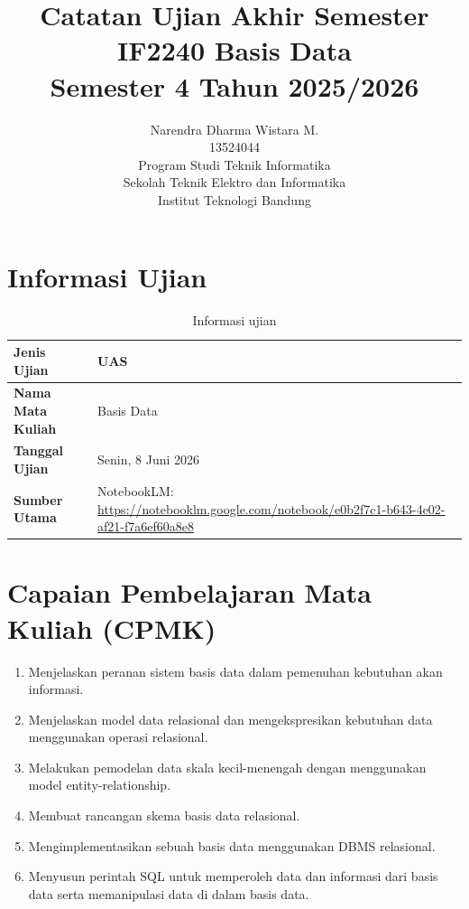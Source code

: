 \documentclass[11pt,a4paper]{article}
\title{%
    \vspace{-2cm}
    \textbf{\LARGE Catatan Ujian Akhir Semester} \\[0.25em]
    \Large IF2240 Basis Data \\[0.25em]
    \normalsize Semester 4 Tahun 2025/2026 \\[2em]
}
\author{%
    Narendra Dharma Wistara M. \\[0.25em]
    13524044 \\[2.5em]
    Program Studi Teknik Informatika \\[0.25em]
    Sekolah Teknik Elektro dan Informatika \\[0.25em]
    Institut Teknologi Bandung \\[0.25em]
}
\begin{document}
\begin{titlepage}
    \maketitle
    \thispagestyle{empty}
\end{titlepage}

\clearpage

\tableofcontents

\clearpage
{}

\section{Informasi Ujian}

\begin{table}[H]
\centering
\begin{tabularx}{\textwidth}{|L{0.30\textwidth}|X|}
\hline
\textbf{Jenis Ujian} & UAS \\
\hline
\textbf{Nama Mata Kuliah} & Basis Data \\
\hline
\textbf{Tanggal Ujian} & Senin, 8 Juni 2026 \\
\hline
\textbf{Sumber Utama} & NotebookLM: \url{https://notebooklm.google.com/notebook/e0b2f7c1-b643-4e02-af21-f7a6ef60a8e8} \\
\hline
\end{tabularx}
\caption{Informasi ujian}
\label{tab:informasi-ujian}
\end{table}

\section{Capaian Pembelajaran Mata Kuliah (CPMK)}

\begin{enumerate}
    \item Menjelaskan peranan sistem basis data dalam pemenuhan kebutuhan akan informasi.
    \item Menjelaskan model data relasional dan mengekspresikan kebutuhan data menggunakan operasi relasional.
    \item Melakukan pemodelan data skala kecil-menengah dengan menggunakan model entity-relationship.
    \item Membuat rancangan skema basis data relasional.
    \item Mengimplementasikan sebuah basis data menggunakan DBMS relasional.
    \item Menyusun perintah SQL untuk memperoleh data dan informasi dari basis data serta memanipulasi data di dalam basis data.
\end{enumerate}
\end{document}
